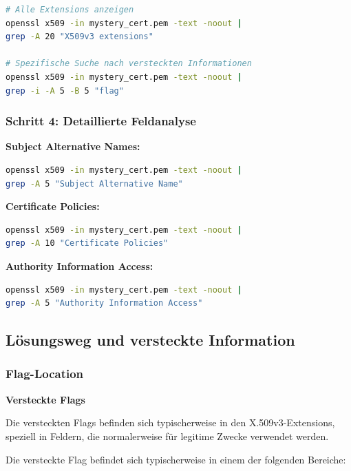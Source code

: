 \documentclass{article}
\begin{document}
\begin{lstlisting}[language=bash]
# Alle Extensions anzeigen
openssl x509 -in mystery_cert.pem -text -noout | 
grep -A 20 "X509v3 extensions"

# Spezifische Suche nach versteckten Informationen
openssl x509 -in mystery_cert.pem -text -noout | 
grep -i -A 5 -B 5 "flag"
\end{lstlisting}

\subsubsection{Schritt 4: Detaillierte Feldanalyse}

\textbf{Subject Alternative Names:}
\begin{lstlisting}[language=bash]
openssl x509 -in mystery_cert.pem -text -noout | 
grep -A 5 "Subject Alternative Name"
\end{lstlisting}

\textbf{Certificate Policies:}
\begin{lstlisting}[language=bash]
openssl x509 -in mystery_cert.pem -text -noout | 
grep -A 10 "Certificate Policies"
\end{lstlisting}

\textbf{Authority Information Access:}
\begin{lstlisting}[language=bash]
openssl x509 -in mystery_cert.pem -text -noout | 
grep -A 5 "Authority Information Access"
\end{lstlisting}

\subsection{Lösungsweg und versteckte Information}

\subsubsection{Flag-Location}

\begin{solutionbox}
\textbf{Versteckte Flags}

Die versteckten Flags befinden sich typischerweise in den X.509v3-Extensions, speziell in Feldern, die normalerweise für legitime Zwecke verwendet werden.
\end{solutionbox}

Die versteckte Flag befindet sich typischerweise in einem der folgenden Bereiche:
\end{document}
